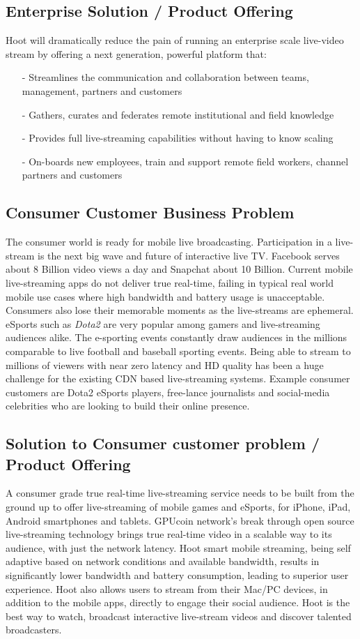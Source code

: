 \documentclass{article}
\begin{document}
\subsection{Enterprise Solution / Product Offering}
Hoot will dramatically reduce the pain of running an enterprise scale live-video stream by offering a next generation, powerful platform that: 
\begin{itemize}
\item[-]Streamlines the communication and collaboration between teams, management, partners and customers
\item[-]Gathers, curates and federates remote institutional and field knowledge
\item[-]Provides full live-streaming capabilities without having to know scaling 
\item[-]On-boards new employees, train and support remote field workers, channel partners and customers
\end{itemize}


\subsection{Consumer Customer Business Problem}
The consumer world is ready for mobile live broadcasting. Participation in a live-stream is the next big wave and future of interactive live TV. Facebook serves about 8 Billion video views a day and Snapchat about 10 Billion. Current mobile live-streaming apps do not deliver true real-time, failing in typical real world mobile use cases where high bandwidth and battery usage is unacceptable. Consumers also lose their memorable moments as the live-streams are ephemeral. eSports such as \emph{Dota2} are very popular among gamers and live-streaming audiences alike. The e-sporting events constantly draw audiences in the millions comparable to live football and baseball sporting events. Being able to stream to millions of viewers with near zero latency and HD quality has been a huge challenge for the existing CDN based live-streaming systems. Example consumer customers are Dota2 eSports players, free-lance journalists and social-media celebrities who are looking to build their online presence.

\subsection{Solution to Consumer customer problem / Product Offering}
A consumer grade true real-time live-streaming service needs to be built from the ground up to offer live-streaming of mobile games and eSports, for iPhone, iPad, Android smartphones and tablets. GPUcoin network's break through open source live-streaming technology brings true real-time video in a scalable way to its audience, with just the network latency. Hoot smart mobile streaming, being self adaptive based on network conditions and available bandwidth, results in significantly lower bandwidth and battery consumption, leading to superior user experience. Hoot also allows users to stream from their Mac/PC devices, in addition to the mobile apps, directly to engage their social audience. Hoot is the best way to watch, broadcast interactive live-stream videos and discover talented broadcasters.
\end{document}
